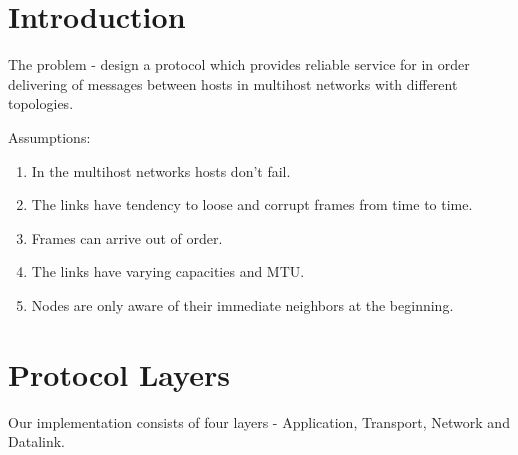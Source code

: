 \documentclass{article}
\begin{document}
\lstset{language=C}

\title{}
\author{Group 7: \\ Sanjar Karaev, Igor Stassiy, Kirill Afanasev}
\date{\today}
\maketitle

\section{Introduction}

	The problem - design a protocol which provides reliable service for
	in order delivering of messages between hosts in multihost networks with
	different topologies.
	
	Assumptions:
	\begin{enumerate}
	  \item In the multihost networks hosts don't fail.
	  \item The links have tendency to loose and corrupt frames from time to
	  time.
	  \item Frames can arrive out of order.
	  \item The links have varying capacities and MTU.
	  \item Nodes are only aware of their immediate neighbors at the beginning.
	\end{enumerate}
	
\section{Protocol Layers}
Our implementation consists of four layers - Application, Transport, Network
and Datalink. 
\end{document}
